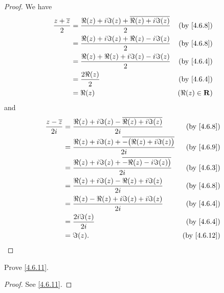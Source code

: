 \begin{proof}
  We have
  \begin{align*}
    \frac{z + \overline{z}}{2} & = \frac{\Re(z) + i \Im(z) + \overline{\Re(z) + i \Im(z)}}{2} & \text{(by \cref{4.6.8})} \\
                               & = \frac{\Re(z) + i \Im(z) + \Re(z) - i \Im(z)}{2}            & \text{(by \cref{4.6.8})} \\
                               & = \frac{\Re(z) + \Re(z) + i \Im(z) - i \Im(z)}{2}            & \text{(by \cref{4.6.4})} \\
                               & = \frac{2 \Re(z)}{2}                                         & \text{(by \cref{4.6.4})} \\
                               & = \Re(z)                                                     & (\Re(z) \in \R)
  \end{align*}
  and
  \begin{align*}
    \frac{z - \overline{z}}{2i} & = \frac{\Re(z) + i \Im(z) - \overline{\Re(z) + i \Im(z)}}{2i}            & \text{(by \cref{4.6.8})}  \\
                                & = \frac{\Re(z) + i \Im(z) + \overline{-\big(\Re(z) + i \Im(z)\big)}}{2i} & \text{(by \cref{4.6.9})}  \\
                                & = \frac{\Re(z) + i \Im(z) + \overline{-\Re(z) - i \Im(z)\big)}}{2i}      & \text{(by \cref{4.6.3})}  \\
                                & = \frac{\Re(z) + i \Im(z) - \Re(z) + i \Im(z)}{2i}                       & \text{(by \cref{4.6.8})}  \\
                                & = \frac{\Re(z) - \Re(z) + i \Im(z) + i \Im(z)}{2i}                       & \text{(by \cref{4.6.4})}  \\
                                & = \frac{2i \Im(z)}{2i}                                                   & \text{(by \cref{4.6.4})}  \\
                                & = \Im(z).                                                                & \text{(by \cref{4.6.12})}
  \end{align*}
\end{proof}

\begin{exercise}\label{ex 4.6.6}
  Prove \cref{4.6.11}.
\end{exercise}

\begin{proof}
  See \cref{4.6.11}.
\end{proof}

